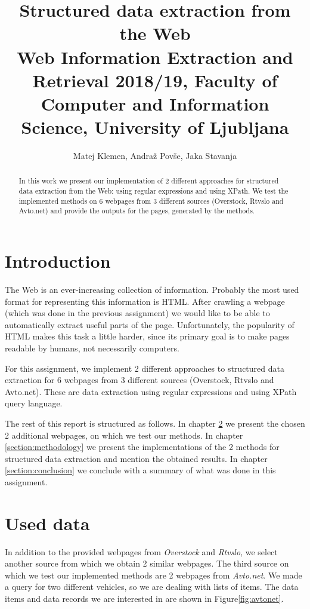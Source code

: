 \documentclass[9pt]{IEEEtran}
\title{\vspace{0ex} %
Structured data extraction from the Web
\\ \normalsize{Web Information Extraction and Retrieval 2018/19, Faculty of Computer and Information Science, University of Ljubljana}}
\author{ %
Matej Klemen, Andraž Povše, Jaka Stavanja
\vspace{-4.0ex}
}
\begin{document}
\maketitle

\begin{abstract}
In this work we present our implementation of 2 different approaches for structured data extraction from the Web: using regular expressions and using XPath.
We test the implemented methods on 6 webpages from 3 different sources (Overstock, Rtvslo and Avto.net) and provide the outputs for the pages, generated by the methods.
\end{abstract}

\section{Introduction}

The Web is an ever-increasing collection of information. 
Probably the most used format for representing this information is HTML.
After crawling a webpage (which was done in the previous assignment) we would like to be able to automatically extract useful parts of the page.
Unfortunately, the popularity of HTML makes this task a little harder, since its primary goal is to make pages readable by humans, not necessarily computers.

For this assignment, we implement 2 different approaches to structured data extraction for 6 webpages from 3 different sources (Overstock, Rtvslo and Avto.net). 
These are data extraction using regular expressions and using XPath query language.

The rest of this report is structured as follows. 
In chapter \ref{section:used-data} we present the chosen 2 additional webpages, on which we test our methods.
In chapter \ref{section:methodology} we present the implementations of the 2 methods for structured data extraction and mention the obtained results.
In chapter \ref{section:conclusion} we conclude with a summary of what was done in this assignment.

\section{Used data}
\label{section:used-data}

In addition to the provided webpages from \textit{Overstock} and \textit{Rtvslo}, we select another source from which we obtain 2 similar webpages.
The third source on which we test our implemented methods are 2 webpages from \textit{Avto.net}. 
We made a query for two different vehicles, so we are dealing with lists of items.
The data items and data records we are interested in are shown in Figure\ref{fig:avtonet}.
\end{document}
